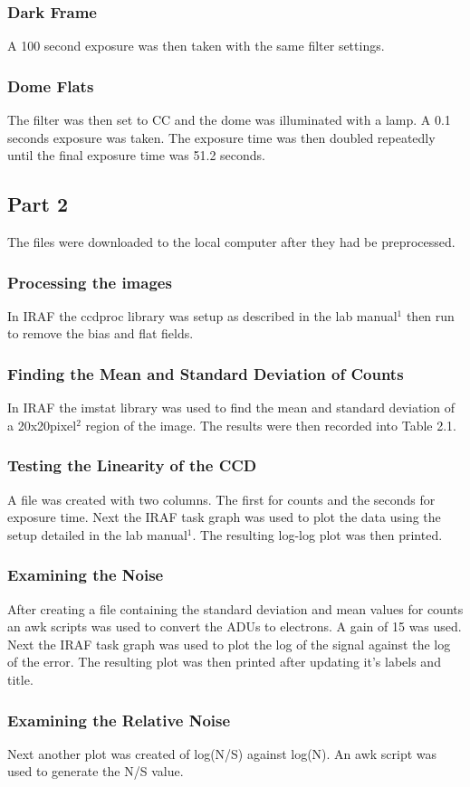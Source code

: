 \documentclass{article}
\begin{document}
\subsubsection{Dark Frame}
A 100 second exposure was then taken with the same filter settings. 
\subsubsection{Dome Flats}
The filter was then set to CC and the dome was illuminated with a lamp. A 0.1 seconds exposure was taken. The exposure time was then doubled repeatedly until the final exposure time was 51.2 seconds.
\subsection{Part 2}
The files were downloaded to the local computer after they had be preprocessed.
\subsubsection{Processing the images}
In IRAF the ccdproc library was setup as described in the lab manual$^1$ then run to remove the bias and flat fields.
\subsubsection{Finding the Mean and Standard Deviation of Counts}
In IRAF the imstat library was used to find the mean and standard deviation of a 20x20pixel$^2$ region of the image. The results were then recorded into Table 2.1.
\subsubsection{Testing the Linearity of the CCD}
A file was created with two columns. The first for counts and the seconds for exposure time. Next the IRAF task graph was used to plot the data using the setup detailed in the lab manual$^1$. The resulting log-log plot was then printed.
\subsubsection{Examining the Noise}
After creating a file containing the standard deviation and mean values for counts an awk scripts was used to convert the ADUs to electrons. A gain of 15 was used. Next the IRAF task graph was used to plot the log of the signal against the log of the error. The resulting plot was then printed after updating it's labels and title.
\subsubsection{Examining the Relative Noise}
Next another plot was created of log(N/S) against log(N). An awk script was used to generate the N/S value.
\end{document}
